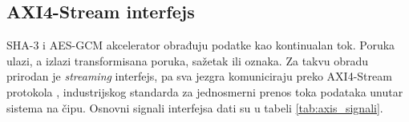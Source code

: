 \subsection{AXI4-Stream interfejs}
\label{subsec:hw_axis}

SHA-3 i AES-GCM akcelerator obrađuju podatke kao kontinualan tok. Poruka ulazi, a izlazi transformisana poruka, sažetak ili oznaka. Za takvu obradu prirodan je \textit{streaming} interfejs, pa sva jezgra komuniciraju preko AXI4-Stream protokola \cite{axi4}, industrijskog standarda za jednosmerni prenos toka podataka unutar sistema na čipu. Osnovni signali interfejsa dati su u tabeli \ref{tab:axis_signali}.

\begin{table}[H]
\caption{Osnovni signali AXI4-Stream interfejsa}
\centering
{}
\label{tab:axis_signali}
\end{table}

